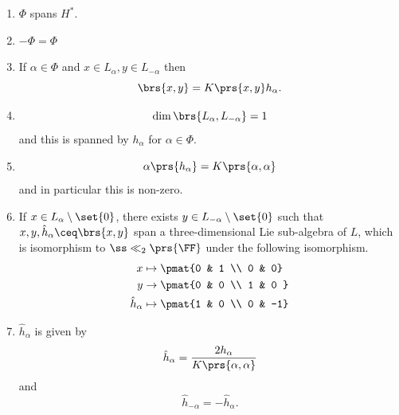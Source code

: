 \documentclass[10pt,a4paper,twoside,openany,hidelinks]{book}
\begin{document}
\begin{theorem}
\begin{enumerate}
\item $\Phi$ spans $H^*$.
\item $-\Phi = \Phi$
\item If $\alpha \in \Phi$ and $x \in L_{\alpha}, y \in L_{-\alpha}$ then \[\brs{x,y} = K\prs{x,y}h_{\alpha}\text{.}\]
\item \[\dim\brs{L_{\alpha}, L_{-\alpha}} = 1\] and this is spanned by $h_{\alpha}$ for $\alpha \in \Phi$.
\item \[\alpha\prs{h_{\alpha}} = K\prs{\alpha,\alpha}\]
and in particular this is non-zero.
\item If $x \in L_{\alpha} \setminus \set{0}$, there exists $y \in L_{-\alpha} \setminus \set{0}$ such that $x,y,\hat{h}_{\alpha} \ceq \brs{x,y}$ span a three-dimensional  Lie sub-algebra of $L$, which is isomorphism to $\ss\ll_2\prs{\FF}$ under the following isomorphism.
\begin{align*}
x &\mapsto \pmat{0 & 1 \\ 0 & 0} \\
y &\to \pmat{0 & 0 \\ 1 & 0 } \\
\hat{h}_{\alpha} &\mapsto \pmat{1 & 0 \\ 0 & -1}
\end{align*}
\item $\hat{h}_{\alpha}$ is given by \[\hat{h}_{\alpha} = \frac{2 h_{\alpha}}{K\prs{\alpha,\alpha}}\]
and
\[\hat{h}_{-\alpha} = -\hat{h}_{\alpha} \text{.}\]
\end{enumerate}
\end{theorem}
\end{document}
